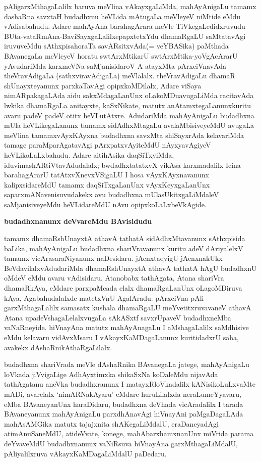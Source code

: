 pAligarxMthagaLalilx baruva meVlina vAkayxgaLiMda, mahAyAnigaLu tamamx dashaRna savxtaH budadhxnu heVLida mAtugaLa meVleyeV niMtide eMdu vAdisabahudu. Adare mahAyAna barahagArara meVle TiVkegaLedidxruvudu BUta-vataRmAna-BaviSayxgaLalilx\break epapxtetxYdu dhamaRgaLU saMtatavAgi iruvuveMdu sAthxpisahoraTa savARsitxvAda\break (= veYBASika) paMthada BAvanegaLa meVleyeV horatu swtArxMtikarU swtArxMtika-\-yoVgAcArarU yAvudariMda karxmeVNa saMjanisidaroV A atayxMta pArxciVnavAda theVravAdigaLa (sathxviravAdigaLa) meVlalalx. theVravAdigaLu dhamaR shUnayxteyanunx parxkaTa\-vAgi opipxkoMDilalx, Adare viSaya nimARpakagaLAda aidu sakxMdagaLanUnx oLakoMDu\break avugaLiMda racitavAda lwkika dhamaRgaLa anitayxte, kaSxNikate, matutx anAtamxtegaLanunx\break kuritu avaru padeV padeV otitx heVLutAtxre. AdudariMda mahAyAnigaLu \hbox{budadhxna} mUla heVLikegaLanunx tamamx sidAdhxMtagaLu avalaMbisiveyeMdU avugaLa meVlina tamamx\break vAyxKAyxna budadhxna savxMta shiSayxrAda kelavariMda tamage paraMparAgatavAgi pArxpatxvAyi\-teMdU nAyxyavAgiyeV heVLikoLaLxbahudu. Adare aitihAsika daqSiTxyiMda, idu\break vimashARtiVtavAdudalalx; bwdadhxtatatxvX vikAsa karxmadalilx Icina barahagArarU tatAtxvXnevxVSigaLU I hosa vAyxKAyxnavanunx kalipxsidareMdU tamamx daqSiTxgaLanUnx vAyxKeyxgaLanUnx saparx\-mANavenisuvudakekx avu budadhxna mUlasUkitxgaLiMdaleV saMjanisiveyeMdu heVLida\-reMdU nAvu opipxkoLaLxbeVkAgide.

\begin{center}
{\textbf{\Large budadhxnanunx deVvareMdu BAvisidudu}}
\end{center}

tamamx dhamaRshUnayxtA athavA tathatA sidAdhxMtavanunx sAthxpisida baLika, mahAyAnigaLu budadhxna shariVravanunx kuritu adeV dAriyalelxV tamamx vicArasaraNiyanunx naDesi\-daru. jAcnxtaqvigU jAcnxnakUkx BeVdavilalxvAdudariMda dhamaRshUnayxtA athavA tathatA hAgU budadhxnU oMdeV eMdu avaru vAdisidaru. Atanobabx tathAgata, Atana shariVra dhamaRkAya, eMdare parxpaMcada elalx dhamaRgaLanUnx oLagoMDiruva kAya, Agabahudalalxde matetxVnU AgalAradu. pArxciVna pAli garxMthagaLalilx samasatx kushala dhamaRgaLU meYvetitxruvavaneV athavA Atana upadeVshagaLelalxvugaLa sAkASxtf savxrUpaveV budadhxneMba vaNaRneyide. hiVnayAna matutx mahAyAnagaLu I aMshagaLalilx saMdhisive eMdu kelavaru vidAvxMsaru I vAkayxKaMDagaLanunx kuritidadxrU saha, avakekx dAshaRnikAthaR\-gaLilalx.

budadhxna shariVrada meVle dAshaRnika BAvanegaLa jatege, mahAyAnigaLu loVkada jiVvigaLige AdhAyxtimxka shikaSxNa koDaleMdu nijavAda tathAgatanu aneVka budadhxranunx I matayxRloVkadalilx kANisikoLuLxvaMte mADi, avarelalx `nimARNakAyaru' eMdare huruLilalxda neraLumeYyavaru, eMba BAvaneyanUnx haraDidaru, budadhxna deVhada vicAradalilx I tarada BAvaneyanunx mahAyAnigaLu parxdhAnavAgi hiVnayAni paMgaDagaLAda mahAsAMGika matutx tajajxnita shAKegaLiMdalU, eraDaneyadAgi atimAnuSaneMdU, atideVvate, konege, mahAbarxhamxnanUnx miVrida parama deYvaveMdU budadhxnanunx vaNiRsuva hiVnayAna garxMthagaLiMdalU, pAliyalilxruva vAkayxKaMDagaLiMdalU paDedaru.

